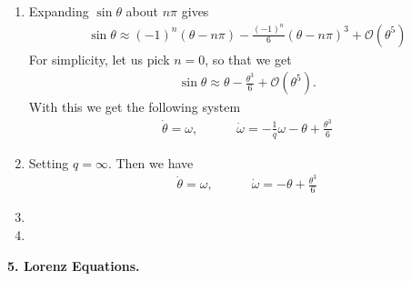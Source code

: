 \documentclass{article}
\theoremstyle{definition}
\newcommand{\f}[2]{\frac{#1}{#2}}
\begin{document}
\begin{enumerate}[label=(\alph*)]
	\item Expanding $\sin\theta$ about $n\pi$ gives
	\begin{align*}
	\sin\theta \approx (-1)^n( \theta - n\pi) - \f{(-1)^n}{6} (\theta - n\pi)^3 + \mathcal{O}(\theta^5)
	\end{align*}
	For simplicity, let us pick $n=0$, so that we get
	\begin{align*}
	\sin\theta \approx \theta - \f{\theta^3}{6} + \mathcal{O}(\theta^5). 
	\end{align*}
	With this we get the following system
	\begin{align*}
	\boxed{\dot\theta = \omega, \quad\quad\quad \dot \omega = -\f{1}{q} \omega - \theta + \f{\theta^3}{6}}
	\end{align*}
	
	
	\item Setting $q=\infty$. Then we have
	\begin{align*}
	\dot\theta = \omega, \quad\quad\quad \dot \omega = - \theta + \f{\theta^3}{6}
	\end{align*}
	
	
	
	
	
	\item 
	
	\item 
\end{enumerate}

\noindent \textbf{5. Lorenz Equations.}
\end{document}
